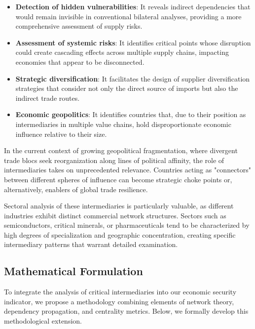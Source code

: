 \documentclass[final,1p,times,authoryear]{elsarticle}
\begin{document}
\begin{itemize}
    \item \textbf{Detection of hidden vulnerabilities}: It reveals indirect dependencies that would remain invisible in conventional bilateral analyses, providing a more comprehensive assessment of supply risks.

    \item \textbf{Assessment of systemic risks}: It identifies critical points whose disruption could create cascading effects across multiple supply chains, impacting economies that appear to be disconnected.

    \item \textbf{Strategic diversification}: It facilitates the design of supplier diversification strategies that consider not only the direct source of imports but also the indirect trade routes.

    \item \textbf{Economic geopolitics}: It identifies countries that, due to their position as intermediaries in multiple value chains, hold disproportionate economic influence relative to their size.
\end{itemize}

In the current context of growing geopolitical fragmentation, where divergent trade blocs seek reorganization along lines of political affinity, the role of intermediaries takes on unprecedented relevance. Countries acting as "connectors" between different spheres of influence can become strategic choke points or, alternatively, enablers of global trade resilience.

Sectoral analysis of these intermediaries is particularly valuable, as different industries exhibit distinct commercial network structures. Sectors such as semiconductors, critical minerals, or pharmaceuticals tend to be characterized by high degrees of specialization and geographic concentration, creating specific intermediary patterns that warrant detailed examination.

\subsection{Mathematical Formulation}

To integrate the analysis of critical intermediaries into our economic security indicator, we propose a methodology combining elements of network theory, dependency propagation, and centrality metrics. Below, we formally develop this methodological extension.
\end{document}

